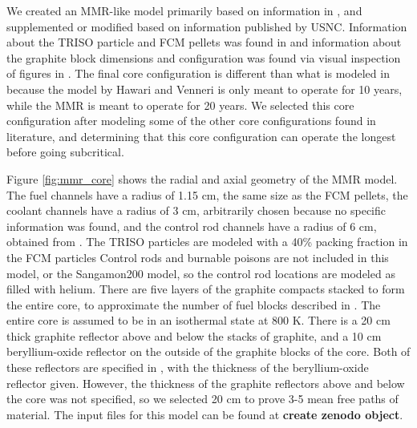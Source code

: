 We created an \gls{MMR}-like model primarily based on information in 
\cite{hawari_development_2018}, and supplemented or modified based on 
information published by \gls{USNC}. Information about the \gls{TRISO} 
particle and \gls{FCM} pellets was found in \cite{noauthor_usnc_2021}
and information about the graphite block dimensions and configuration 
was found via visual inspection of figures in \cite{venneri_micro_2019}. 
The final core configuration 
is different than what is modeled in \cite{hawari_development_2018} 
because the model by Hawari and Venneri is only meant to operate 
for 10 years, while the \gls{MMR} is meant to operate for 20 years. We 
selected this core configuration after modeling some of the other core 
configurations found in literature, and determining that this core 
configuration can operate the longest before going subcritical. 

Figure \ref{fig:mmr_core} shows the radial and axial geometry of the 
\gls{MMR} model. The fuel channels have a radius of 1.15 cm, the same
size as the \gls{FCM} pellets, the coolant channels have a radius of 
3 cm, arbitrarily chosen because no specific information was found, 
and the control rod channels have a radius of 6 cm, obtained from 
\cite{hawari_development_2018}. The \gls{TRISO} particles are modeled 
with a 40\% packing fraction in the \gls{FCM} particles
Control rods and burnable poisons are not included in this model, or 
the Sangamon200 model, so the control rod locations are modeled as 
filled with helium. There are five layers of the graphite compacts 
stacked to form the entire core, to approximate the number of 
fuel blocks described in \cite{noauthor_usnc_2021}. The entire core 
is assumed to be in an isothermal state at 800 K. There is a 20 cm 
thick graphite reflector above and below the stacks of graphite, 
and a 10 cm beryllium-oxide reflector on the outside of the 
graphite blocks of the core. Both of these reflectors are specified 
in \cite{hawari_development_2018}, with the thickness of the 
beryllium-oxide reflector given. However, the thickness of the graphite 
reflectors above and below the core was not specified, so we selected 
20 cm to prove 3-5 mean free paths of material. 
The input files for this model can be found at \textbf{create zenodo 
object}.

